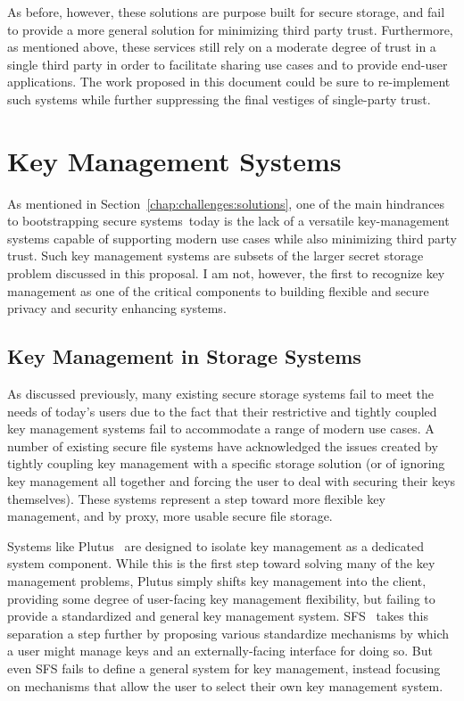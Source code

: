As before, however, these solutions are purpose built for secure
storage, and fail to provide a more general solution for minimizing
third party trust. Furthermore, as mentioned above, these services
still rely on a moderate degree of trust in a single third party in
order to facilitate sharing use cases and to provide end-user
applications. The work proposed in this document could be sure to
re-implement such systems while further suppressing the final vestiges
of single-party trust.

\section{Key Management Systems}
\label{chap:related:keymgmt}

As mentioned in Section~\ref{chap:challenges:solutions}, one of the
main hindrances to bootstrapping secure systems\ today is the lack of
a versatile key-management systems capable of supporting modern use
cases while also minimizing third party trust. Such key management
systems are subsets of the larger secret storage problem discussed in
this proposal. I am not, however, the first to recognize key
management as one of the critical components to building flexible and
secure privacy and security enhancing systems.

\subsection{Key Management in Storage Systems}

As discussed previously, many existing secure storage systems fail to
meet the needs of today's users due to the fact that their restrictive
and tightly coupled key management systems fail to accommodate a range
of modern use cases. A number of existing secure file systems have
acknowledged the issues created by tightly coupling key management
with a specific storage solution (or of ignoring key management all
together and forcing the user to deal with securing their keys
themselves). These systems represent a step toward more flexible key
management, and by proxy, more usable secure file storage.

Systems like Plutus~\cite{kallahalla2003} are designed to isolate key
management as a dedicated system component. While this is the first
step toward solving many of the key management problems, Plutus simply
shifts key management into the client, providing some degree of
user-facing key management flexibility, but failing to provide a
standardized and general key management
system. SFS~\cite{mazieres1999} takes this separation a step further
by proposing various standardize mechanisms by which a user might
manage keys and an externally-facing interface for doing so. But even
SFS fails to define a general system for key management, instead
focusing on mechanisms that allow the user to select their own key
management system.

